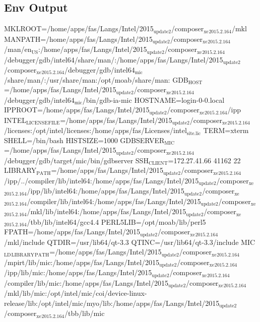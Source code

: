\documentclass[11pt]{article}
\begin{document}
\subsection{Env Output}
\label{sec:org79706c2}
MKLROOT=/home/apps/fas/Langs/Intel/2015\(_{\text{update2}}\)/composer\(_{\text{xe}}\)\(_{\text{2015.2.164}}\)/mkl
MANPATH=/home/apps/fas/Langs/Intel/2015\(_{\text{update2}}\)/composer\(_{\text{xe}}\)\(_{\text{2015.2.164}}\)/man/en\(_{\text{US}}\):/home/apps/fas/Langs/Intel/2015\(_{\text{update2}}\)/composer\(_{\text{xe}}\)\(_{\text{2015.2.164}}\)/debugger/gdb/intel64/share/man/:/home/apps/fas/Langs/Intel/2015\(_{\text{update2}}\)/composer\(_{\text{xe}}\)\(_{\text{2015.2.164}}\)/debugger/gdb/intel64\(_{\text{mic}}\)/share/man/:/usr/share/man:/opt/moab/share/man:
GDB\(_{\text{HOST}}\)=/home/apps/fas/Langs/Intel/2015\(_{\text{update2}}\)/composer\(_{\text{xe}}\)\(_{\text{2015.2.164}}\)/debugger/gdb/intel64\(_{\text{mic}}\)/bin/gdb-ia-mic
HOSTNAME=login-0-0.local
IPPROOT=/home/apps/fas/Langs/Intel/2015\(_{\text{update2}}\)/composer\(_{\text{xe}}\)\(_{\text{2015.2.164}}\)/ipp
INTEL\(_{\text{LICENSE}}\)\(_{\text{FILE}}\)=/home/apps/fas/Langs/Intel/2015\(_{\text{update2}}\)/composer\(_{\text{xe}}\)\(_{\text{2015.2.164}}\)/licenses:/opt/intel/licenses:/home/apps/fas/Licenses/intel\(_{\text{site.lic}}\)
TERM=xterm
SHELL=/bin/bash
HISTSIZE=1000
GDBSERVER\(_{\text{MIC}}\)=/home/apps/fas/Langs/Intel/2015\(_{\text{update2}}\)/composer\(_{\text{xe}}\)\(_{\text{2015.2.164}}\)/debugger/gdb/target/mic/bin/gdbserver
SSH\(_{\text{CLIENT}}\)=172.27.41.66 41162 22
LIBRARY\(_{\text{PATH}}\)=/home/apps/fas/Langs/Intel/2015\(_{\text{update2}}\)/composer\(_{\text{xe}}\)\(_{\text{2015.2.164}}\)/ipp/../compiler/lib/intel64:/home/apps/fas/Langs/Intel/2015\(_{\text{update2}}\)/composer\(_{\text{xe}}\)\(_{\text{2015.2.164}}\)/ipp/lib/intel64:/home/apps/fas/Langs/Intel/2015\(_{\text{update2}}\)/composer\(_{\text{xe}}\)\(_{\text{2015.2.164}}\)/compiler/lib/intel64:/home/apps/fas/Langs/Intel/2015\(_{\text{update2}}\)/composer\(_{\text{xe}}\)\(_{\text{2015.2.164}}\)/mkl/lib/intel64:/home/apps/fas/Langs/Intel/2015\(_{\text{update2}}\)/composer\(_{\text{xe}}\)\(_{\text{2015.2.164}}\)/tbb/lib/intel64/gcc4.4
PERL5LIB=/opt/moab/lib/perl5
FPATH=/home/apps/fas/Langs/Intel/2015\(_{\text{update2}}\)/composer\(_{\text{xe}}\)\(_{\text{2015.2.164}}\)/mkl/include
QTDIR=/usr/lib64/qt-3.3
QTINC=/usr/lib64/qt-3.3/include
MIC\(_{\text{LD}}\)\(_{\text{LIBRARY}}\)\(_{\text{PATH}}\)=/home/apps/fas/Langs/Intel/2015\(_{\text{update2}}\)/composer\(_{\text{xe}}\)\(_{\text{2015.2.164}}\)/mpirt/lib/mic:/home/apps/fas/Langs/Intel/2015\(_{\text{update2}}\)/composer\(_{\text{xe}}\)\(_{\text{2015.2.164}}\)/ipp/lib/mic:/home/apps/fas/Langs/Intel/2015\(_{\text{update2}}\)/composer\(_{\text{xe}}\)\(_{\text{2015.2.164}}\)/compiler/lib/mic:/home/apps/fas/Langs/Intel/2015\(_{\text{update2}}\)/composer\(_{\text{xe}}\)\(_{\text{2015.2.164}}\)/mkl/lib/mic:/opt/intel/mic/coi/device-linux-release/lib:/opt/intel/mic/myo/lib:/home/apps/fas/Langs/Intel/2015\(_{\text{update2}}\)/composer\(_{\text{xe}}\)\(_{\text{2015.2.164}}\)/tbb/lib/mic
\end{document}
